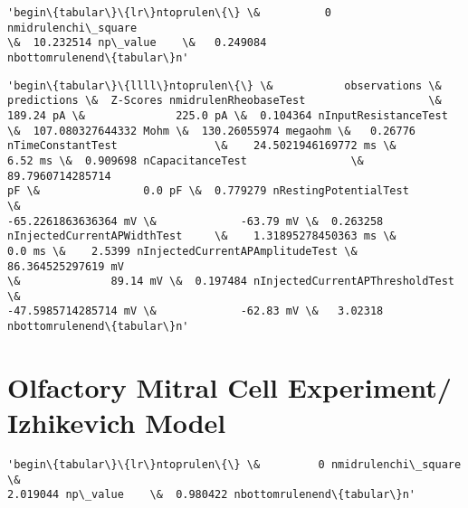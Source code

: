             \begin{tcolorbox}[breakable, size=fbox, boxrule=.5pt, pad at break*=1mm, opacityfill=0]
\begin{Verbatim}[commandchars=\\\{\}]
'begin\{tabular\}\{lr\}ntoprulen\{\} \&          0 nmidrulenchi\_square
\&  10.232514 np\_value    \&   0.249084
nbottomrulenend\{tabular\}n'
\end{Verbatim}
\end{tcolorbox}
        
            \begin{tcolorbox}[breakable, size=fbox, boxrule=.5pt, pad at break*=1mm, opacityfill=0]
\begin{Verbatim}[commandchars=\\\{\}]
'begin\{tabular\}\{llll\}ntoprulen\{\} \&           observations \&
predictions \&  Z-Scores nmidrulenRheobaseTest                   \&
189.24 pA \&              225.0 pA \&  0.104364 nInputResistanceTest
\&  107.080327644332 Mohm \&  130.26055974 megaohm \&   0.26776
nTimeConstantTest               \&    24.5021946169772 ms \&
6.52 ms \&  0.909698 nCapacitanceTest                \&    89.7960714285714
pF \&                0.0 pF \&  0.779279 nRestingPotentialTest           \&
-65.2261863636364 mV \&             -63.79 mV \&  0.263258
nInjectedCurrentAPWidthTest     \&    1.31895278450363 ms \&
0.0 ms \&    2.5399 nInjectedCurrentAPAmplitudeTest \&     86.364525297619 mV
\&              89.14 mV \&  0.197484 nInjectedCurrentAPThresholdTest \&
-47.5985714285714 mV \&             -62.83 mV \&   3.02318
nbottomrulenend\{tabular\}n'
\end{Verbatim}
\end{tcolorbox}
        
    \hypertarget{olfactory-mitral-cell-experiment-izhikevich-model}{%
\section{Olfactory Mitral Cell Experiment/ Izhikevich
Model}\label{olfactory-mitral-cell-experiment-izhikevich-model}}

            \begin{tcolorbox}[breakable, size=fbox, boxrule=.5pt, pad at break*=1mm, opacityfill=0]
\begin{Verbatim}[commandchars=\\\{\}]
'begin\{tabular\}\{lr\}ntoprulen\{\} \&         0 nmidrulenchi\_square \&
2.019044 np\_value    \&  0.980422 nbottomrulenend\{tabular\}n'
\end{Verbatim}
\end{tcolorbox}
        
